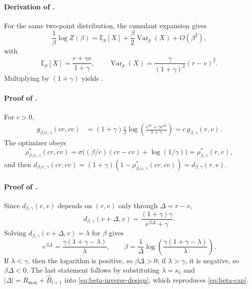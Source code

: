 \documentclass{article}
\theoremstyle{remark}
\DeclareMathOperator{\Var}{Var}
\newcommand{\E}{\mathbb{E}}
\newcommand{\Bhat}{\widehat B}
\begin{document}
\paragraph{Derivation of .}
For the same two-point distribution, the cumulant expansion gives
\[
\frac{1}{\beta}\log Z(\beta)=\E_p[X]+\frac{\beta}{2}\Var_p(X)+O(\beta^2),
\]
with
\[
\E_p[X]=\frac{r+\gamma v}{1+\gamma},
\qquad
\Var_p(X)=\frac{\gamma}{(1+\gamma)^2}(r-v)^2.
\]
Multiplying by $(1+\gamma)$ yields .

\paragraph{Proof of .}
For $c>0$,
\begin{align*}
g_{\beta/c,\gamma}(cr,cv)
&=(1+\gamma)\frac{c}{\beta}
\log\!\left(\frac{e^{\beta r}+\gamma e^{\beta v}}{1+\gamma}\right)
= c\,g_{\beta,\gamma}(r,v).
\end{align*}
The optimizer obeys
\[
\rho^*_{\beta/c,\gamma}(cr,cv)
=\sigma\!\bigl((\beta/c)(cr-cv)+\log(1/\gamma)\bigr)
=\rho^*_{\beta,\gamma}(r,v),
\]
and then $d_{\beta/c,\gamma}(cr,cv)=(1+\gamma)(1-\rho^*_{\beta/c,\gamma}(cr,cv))=d_{\beta,\gamma}(r,v)$.

\paragraph{Proof of .}
Since $d_{\beta,\gamma}(r,v)$ depends on $(r,v)$ only through $\Delta=r-v$,
\[
d_{\beta,\gamma}(v+\Delta,v)=\frac{(1+\gamma)\gamma}{e^{\beta\Delta}+\gamma}.
\]
Solving $d_{\beta,\gamma}(v+\Delta,v)=\lambda$ for $\beta$ gives
\[
e^{\beta\Delta}=\frac{\gamma(1+\gamma-\lambda)}{\lambda},
\qquad
\beta=\frac{1}{\Delta}\log\!\left(\frac{\gamma(1+\gamma-\lambda)}{\lambda}\right).
\]
If $\lambda<\gamma$, then the logarithm is positive, so $\beta\Delta>0$; if $\lambda>\gamma$, it is negative, so $\beta\Delta<0$. The last statement follows by substituting $\lambda=\kappa_t$ and $|\Delta|=R_{\max}+\Bhat_{t+1}$ into \eqref{eq:beta-inverse-design}, which reproduces \eqref{eq:beta-cap}.
\end{document}
